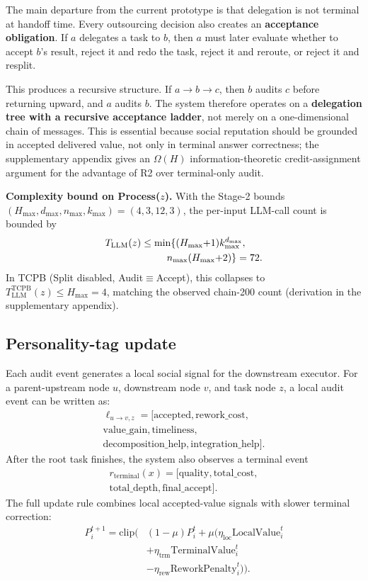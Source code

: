 \documentclass[11pt]{article}
\begin{document}
The main departure from the current prototype is that delegation is not terminal at handoff time. Every outsourcing decision also creates an \textbf{acceptance obligation}. If $a$ delegates a task to $b$, then $a$ must later evaluate whether to accept $b$'s result, reject it and redo the task, reject it and reroute, or reject it and resplit.

This produces a recursive structure. If $a \rightarrow b \rightarrow c$, then $b$ audits $c$ before returning upward, and $a$ audits $b$. The system therefore operates on a \textbf{delegation tree with a recursive acceptance ladder}, not merely on a one-dimensional chain of messages. This is essential because social reputation should be grounded in accepted delivered value, not only in terminal answer correctness; the supplementary appendix gives an $\Omega(H)$ information-theoretic credit-assignment argument for the advantage of R2 over terminal-only audit.

\textbf{Complexity bound on Process($z$).} With the Stage-2 bounds $(H_{\max}, d_{\max}, n_{\max}, k_{\max}){=}(4,3,12,3)$, the per-input LLM-call count is bounded by
\begin{align*}
T_{\mathrm{LLM}}(z)
&\le \min\{(H_{\max}{+}1)k_{\max}^{d_{\max}},\\
&\hspace{2.6em} n_{\max}(H_{\max}{+}2)\}=72 .
\end{align*}
In TCPB (Split disabled, Audit$\equiv$Accept), this collapses to $T_{\mathrm{LLM}}^{\mathrm{TCPB}}(z)\le H_{\max}{=}4$, matching the observed chain-200 count (derivation in the supplementary appendix).

\subsection{Personality-tag update}

Each audit event generates a local social signal for the downstream executor. For a parent-upstream node $u$, downstream node $v$, and task node $z$, a local audit event can be written as:
\begin{multline*}
\ell_{u \rightarrow v, z} = [\text{accepted}, \text{rework\_cost},\\
\text{value\_gain}, \text{timeliness},\\
\text{decomposition\_help}, \text{integration\_help}].
\end{multline*}
After the root task finishes, the system also observes a terminal event
\begin{multline*}
r_{\mathrm{terminal}}(x) = [\text{quality}, \text{total\_cost},\\
\text{total\_depth}, \text{final\_accept}].
\end{multline*}
The full update rule combines local accepted-value signals with slower terminal correction:
\begin{align*}
P_i^{t+1} = \mathrm{clip}\Big(&(1-\mu) P_i^t + \mu \big(\eta_{\mathrm{loc}} \mathrm{LocalValue}_i^t \\
&+ \eta_{\mathrm{trm}} \mathrm{TerminalValue}_i^t \\
&- \eta_{\mathrm{rew}} \mathrm{ReworkPenalty}_i^t \big)\Big).
\end{align*}
\end{document}

